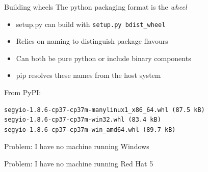 \documentclass[pdf]{beamer}
\begin{document}
\begin{frame}[fragile]{Building wheels}
    The python packaging format is the \emph{wheel}

    \begin{itemize}
        \item setup.py can build with \verb|setup.py bdist_wheel|
        \item Relies on naming to distinguish package flavours
        \item Can both be pure python or include binary components
        \item pip resolves these names from the host system
    \end{itemize}

From PyPI:
    \begin{verbatim}
segyio-1.8.6-cp37-cp37m-manylinux1_x86_64.whl (87.5 kB)
segyio-1.8.6-cp37-cp37m-win32.whl (83.4 kB)
segyio-1.8.6-cp37-cp37m-win_amd64.whl (89.7 kB)
    \end{verbatim}

\end{frame}

\begin{frame}
    Problem: I have no machine running Windows
\end{frame}

\begin{frame}
    Problem: I have no machine running Red Hat 5

\end{frame}
\end{document}
